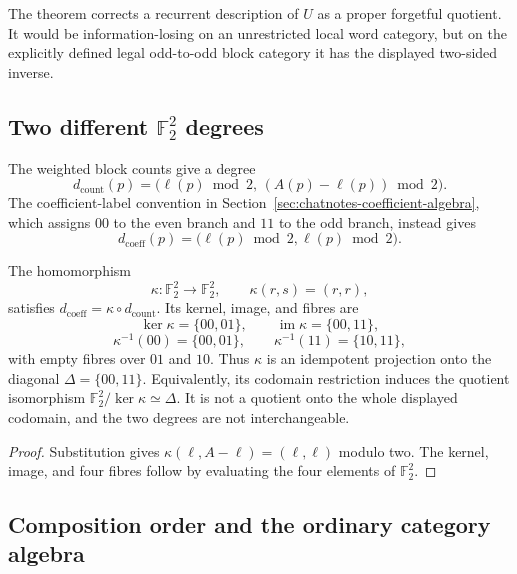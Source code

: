 The theorem corrects a recurrent description of $U$ as a proper forgetful
quotient.  It would be information-losing on an unrestricted local word
category, but on the explicitly defined legal odd-to-odd block category it
has the displayed two-sided inverse.

\subsection{Two different \texorpdfstring{$\mathbb F_2^2$}{F2-squared} degrees}

The weighted block counts give a degree
\[
 d_{\mathrm{count}}(p)
 =\bigl(\ell(p)\bmod2,\,(A(p)-\ell(p))\bmod2\bigr).
\]
The coefficient-label convention in
Section~\ref{sec:chatnotes-coefficient-algebra}, which assigns $00$ to the
even branch and $11$ to the odd branch, instead gives
\[
 d_{\mathrm{coeff}}(p)
   =\bigl(\ell(p)\bmod2,\ell(p)\bmod2\bigr).
\]

\begin{proposition}
\label{prop:chatnotes-two-path-gradings}
The homomorphism
\[
 \kappa:\mathbb F_2^2\longrightarrow\mathbb F_2^2,
 \qquad \kappa(r,s)=(r,r),
\]
satisfies $d_{\mathrm{coeff}}=\kappa\circ d_{\mathrm{count}}$.  Its kernel,
image, and fibres are
\[
 \ker\kappa=\{00,01\},
 \qquad \operatorname{im}\kappa=\{00,11\},
\]
\[
 \kappa^{-1}(00)=\{00,01\},
 \qquad
 \kappa^{-1}(11)=\{10,11\},
\]
with empty fibres over $01$ and $10$.  Thus $\kappa$ is an idempotent
projection onto the diagonal $\Delta=\{00,11\}$.  Equivalently, its codomain
restriction induces the quotient isomorphism
$\mathbb F_2^2/\ker\kappa\simeq\Delta$.  It is not a quotient onto the whole
displayed codomain, and the two degrees are not interchangeable.
\end{proposition}

\begin{proof}
Substitution gives
$\kappa(\ell,A-\ell)=(\ell,\ell)$ modulo two.  The kernel, image, and four
fibres follow by evaluating the four elements of $\mathbb F_2^2$.
\end{proof}

\subsection{Composition order and the ordinary category algebra}

